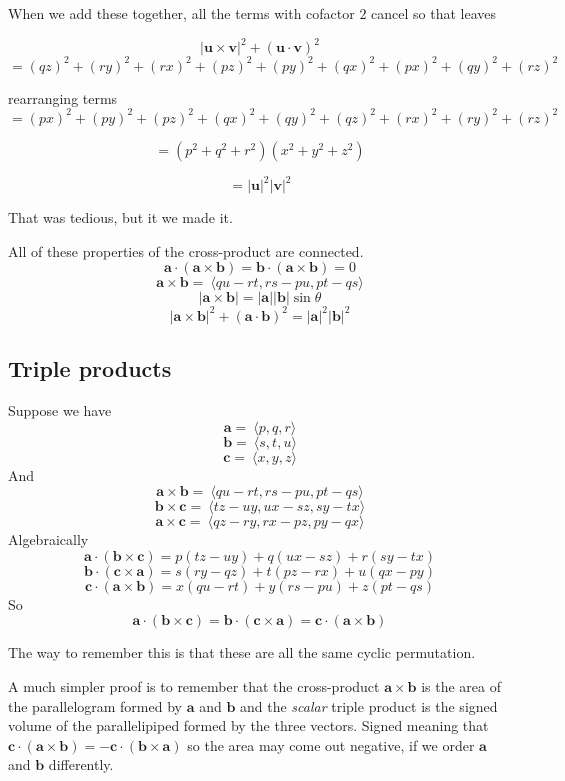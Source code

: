 \documentclass[11pt, oneside]{article}   	%
\begin{document}
When we add these together, all the terms with cofactor $2$ cancel so that leaves

\[ | \mathbf{u} \times \mathbf{v} |^2 + (\mathbf{u} \cdot \mathbf{v})^2 \]
\[ =  (qz)^2 + (ry)^2 + (rx)^2 + (pz)^2 + (py)^2 + (qx)^2 + (px)^2 + (qy)^2 + (rz)^2 \]


rearranging terms
\[ = (px)^2 + (py)^2 + (pz)^2 + (qx)^2 + (qy)^2 + (qz)^2 + (rx)^2 +(ry)^2   + (rz)^2 \]

\[ = (p^2 + q^2 + r^2)(x^2 + y^2 + z^2) \]

\[ = |\mathbf{u}|^2 |\mathbf{v}|^2 \]

That was tedious, but it we made it.

All of these properties of the cross-product are connected.
\[ \mathbf{a}  \cdot (\mathbf{a} \times \mathbf{b}) = \mathbf{b}  \cdot (\mathbf{a} \times \mathbf{b}) = 0 \]
\[ \mathbf{a} \times \mathbf{b} =  \ \langle qu-rt, rs-pu, pt-qs \rangle \]
\[ |\mathbf{a} \times \mathbf{b}|  = |\mathbf{a}| |\mathbf{b}| \sin \theta \]
\[ | \mathbf{a} \times \mathbf{b} |^2 + (\mathbf{a} \cdot \mathbf{b})^2 = |\mathbf{a}|^2 |\mathbf{b}|^2 \]

\subsection*{Triple products}
Suppose we have
\[\mathbf{a} = \ \langle p,q,r \rangle \]
\[\mathbf{b} = \ \langle s,t,u \rangle \]
\[\mathbf{c} = \ \langle x,y,z \rangle \]
And
\[ \mathbf{a} \times \mathbf{b} =  \ \langle qu-rt, rs-pu, pt-qs \rangle \]
\[ \mathbf{b} \times \mathbf{c} =  \ \langle tz-uy, ux-sz, sy-tx \rangle \]
\[ \mathbf{a} \times \mathbf{c} =  \ \langle qz-ry, rx-pz, py-qx \rangle \]
Algebraically
\[ \mathbf{a} \cdot (\mathbf{b} \times \mathbf{c}) = p(tz-uy) + q(ux-sz) + r(sy-tx)  \]
\[ \mathbf{b} \cdot (\mathbf{c} \times \mathbf{a}) = s(ry-qz) + t(pz-rx) + u(qx-py) \]
\[ \mathbf{c} \cdot (\mathbf{a} \times \mathbf{b}) = x(qu-rt) + y(rs-pu) + z(pt-qs) \]
So
\[ \mathbf{a} \cdot (\mathbf{b} \times \mathbf{c}) = \mathbf{b} \cdot (\mathbf{c} \times \mathbf{a}) = \mathbf{c} \cdot (\mathbf{a} \times \mathbf{b}) \]

The way to remember this is that these are all the same cyclic permutation.

A much simpler proof is to remember that the cross-product $\mathbf{a} \times \mathbf{b}$ is the area of the parallelogram formed by $\mathbf{a}$ and $\mathbf{b}$ and the \emph{scalar} triple product is the signed volume of the parallelipiped formed by the three vectors.   Signed meaning that $\mathbf{c} \cdot (\mathbf{a} \times \mathbf{b}) = -\mathbf{c} \cdot (\mathbf{b} \times \mathbf{a})$ so the area may come out negative, if we order $\mathbf{a}$ and $\mathbf{b}$ differently.
\end{document}
